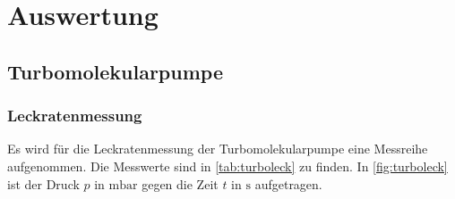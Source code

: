 \section{Auswertung}
\label{sec:Auswertung}

\subsection{Turbomolekularpumpe}
\subsubsection{Leckratenmessung}
Es wird für die Leckratenmessung der Turbomolekularpumpe eine Messreihe aufgenommen. Die Messwerte sind in
\autoref{tab:turboleck} zu finden. In \autoref{fig:turboleck} ist der Druck $p$ in $\si{\milli\bar}$ gegen die
Zeit $t$ in $\si{\second}$ aufgetragen.
